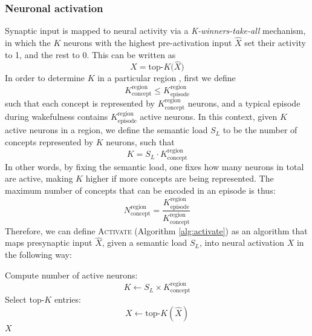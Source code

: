 \documentclass{article}
\providecommand{\DIFaddtex}[1]{{\protect\color{blue}\uwave{#1}}} %
\providecommand{\DIFaddbegin}{} %
\providecommand{\DIFaddend}{} %
\providecommand{\DIFadd}[1]{\texorpdfstring{\DIFaddtex{#1}}{#1}} %
\begin{document}
\subsubsection*{Neuronal activation}
Synaptic input is mapped to neural activity via a \textit{K-winners-take-all} mechanism, in which the $K$ neurons with the highest pre-activation input $\hat{X}$ set their activity to 1, and the rest to 0. This can be written as
\begin{equation}
    X = \textrm{top-}K\big(\hat{X}\big)
\end{equation}
In  order to determine $K$ in a particular region \DIFaddbegin \DIFadd{(or subregion)}\DIFaddend , first we define
\begin{equation}
    K^\textrm{region}_\textrm{concept} \leq K^\textrm{region}_\textrm{episode}
\end{equation}
 such that each concept is represented by $K^\textrm{region}_\textrm{concept}$ neurons, and a typical episode during wakefulness contains $K^\textrm{region}_\textrm{episode}$ active neurons. In this context, given $K$ active neurons in a region, we define the semantic load $S_L$ to be the number of concepts represented by $K$ neurons, such that
 \begin{equation}
     K = S_L \cdot K^\textrm{region}_\textrm{concept}
     \label{eq:semantic_load}
 \end{equation}
In other words, by fixing the semantic load, one fixes how many neurons in total are active, making $K$ higher if more concepts are being represented. The maximum number of concepts that can be encoded in an episode is thus:
 \begin{equation}
     N^\textrm{region}_\textrm{concept} = \frac{K^\textrm{region}_\textrm{episode}}{K^\textrm{region}_\textrm{concept}}
 \end{equation}
 Therefore, we can define \textsc{Activate} (Algorithm \ref{alg:activate}) as an algorithm that maps presynaptic input $\hat{X}$, given a semantic load $S_L$, into neural activation $X$ in the following way:
\begin{algorithm}[h!]
\caption[]{Neuronal Activation}\label{alg:activate}
\begin{algorithmic}[1]
    \State Compute number of active neurons:
        \[
            K \gets S_L \times K^\textrm{region}_\textrm{concept}
        \]
    \State Select top-$K$ entries:
        \[
            X \gets \textrm{top-}K(\hat{X})
        \]
    \State \Return $X$
\EndFunction
\end{algorithmic}
\end{algorithm}
\end{document}
